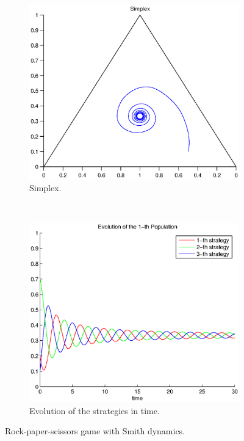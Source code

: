 \documentclass[a4paper,10pt]{article}
\begin{document}
\begin{figure}
  \centering
  \begin{subfigure}[b]{0.45\textwidth}
	  \includegraphics[width=\textwidth]{./images/test1_simplex_smith.eps}
	  \caption{Simplex.}
	  \label{fig:test1_simplex_smith}
  \end{subfigure}
  ~ 
  \begin{subfigure}[b]{0.45\textwidth}
	  \includegraphics[width=\textwidth]{./images/test1_ev_smith.eps}
	  \caption{Evolution of the strategies in time.}
	  \label{fig:test1_ev_smith}
  \end{subfigure}
  \caption{Rock-paper-scissors game with Smith dynamics.}
  \label{fig:rpc_game_smith}
\end{figure}
\end{document}
